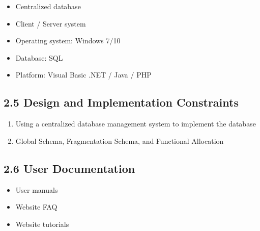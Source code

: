 \documentclass[12pt]{article}
\renewcommand{\_}{\kern-1.5pt\textunderscore\kern-1.5pt}
\begin{document}
\begin{itemize}
	\item Centralized database\par

	\item Client / Server system\par

	\item Operating system: Windows 7/10\par

\setlength{\parskip}{0.0pt}
	\item Database: SQL\par

\setlength{\parskip}{12.0pt}
	\item Platform: Visual Basic .NET / Java / PHP
\end{itemize}\par

\setlength{\parskip}{3.96pt}
\subsection*{2.5 \hspace*{10pt}Design and Implementation Constraints}
\begin{enumerate}
	\item Using a centralized database management system to implement the database\par

	\item Global Schema, Fragmentation Schema, and Functional Allocation
\end{enumerate}\par

\subsection*{2.6 \hspace*{10pt}User Documentation}
\setlength{\parskip}{0.0pt}
\begin{itemize}
	\item User manuals\par

	\item Website FAQ\par

\setlength{\parskip}{12.0pt}
	\item Website tutorials
\end{itemize}\par
\end{document}
